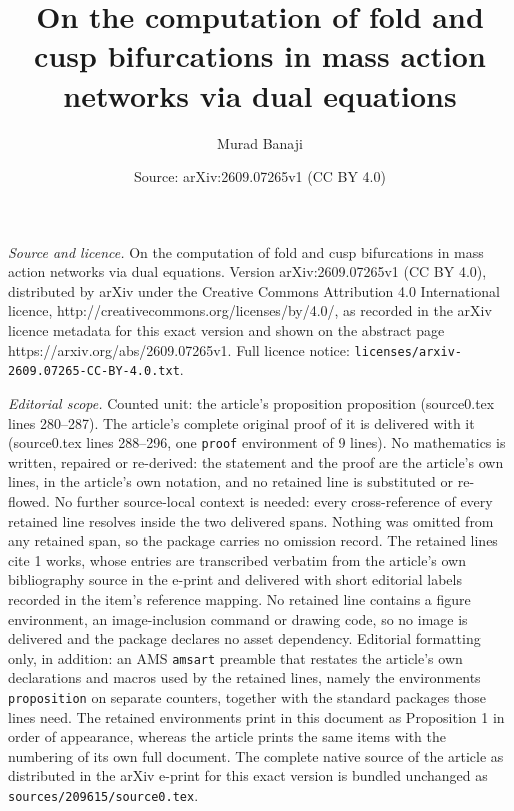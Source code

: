 \documentclass[10pt,a4paper]{amsart}
\title{On the computation of fold and cusp bifurcations in mass action networks via dual equations}
\author{Murad Banaji}
\date{Source: arXiv:2609.07265v1 (CC BY 4.0)}
\begin{document}
\maketitle

\noindent\emph{Source and licence.} On the computation of fold and cusp bifurcations in mass action networks via dual equations. Version arXiv:2609.07265v1 (CC BY 4.0), distributed by arXiv under the Creative Commons Attribution 4.0 International licence, http://creativecommons.org/licenses/by/4.0/, as recorded in the arXiv licence metadata for this exact version and shown on the abstract page https://arxiv.org/abs/2609.07265v1. Full licence notice: \texttt{licenses/arxiv-2609.07265-CC-BY-4.0.txt}.\par\smallskip

\noindent\textit{Editorial scope.} Counted unit: the article's proposition proposition (source0.tex lines 280--287). The article's complete original proof of it is delivered with it (source0.tex lines 288--296, one \texttt{proof} environment of 9 lines). No mathematics is written, repaired or re-derived: the statement and the proof are the article's own lines, in the article's own notation, and no retained line is substituted or re-flowed.  No further source-local context is needed: every cross-reference of every retained line resolves inside the two delivered spans.  Nothing was omitted from any retained span, so the package carries no omission record.  The retained lines cite 1 works, whose entries are transcribed verbatim from the article's own bibliography source in the e-print and delivered with short editorial labels recorded in the item's reference mapping.  No retained line contains a figure environment, an image-inclusion command or drawing code, so no image is delivered and the package declares no asset dependency.  Editorial formatting only, in addition: an AMS \texttt{amsart} preamble that restates the article's own declarations and macros used by the retained lines, namely the environments \texttt{proposition} on separate counters, together with the standard packages those lines need.  The retained environments print in this document as Proposition 1 in order of appearance, whereas the article prints the same items with the numbering of its own full document.  The complete native source of the article as distributed in the arXiv e-print for this exact version is bundled unchanged as \texttt{sources/209615/source0.tex}.
\end{document}
